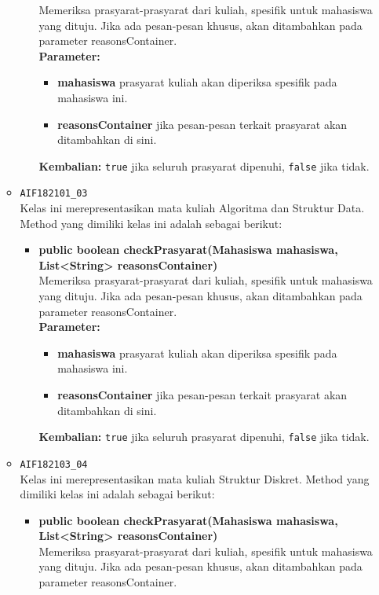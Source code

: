 \begin{enumerate}
\begin{itemize}
\begin{itemize}
			Memeriksa prasyarat-prasyarat dari kuliah, spesifik untuk mahasiswa yang dituju. Jika ada pesan-pesan khusus, akan ditambahkan pada parameter reasonsContainer.\\
			\textbf{Parameter:}
			\begin{itemize}
				\item \textbf{mahasiswa} prasyarat kuliah akan diperiksa spesifik pada mahasiswa ini.
				\item \textbf{reasonsContainer} jika pesan-pesan terkait prasyarat akan ditambahkan di sini.
			\end{itemize}
			\textbf{Kembalian:} \texttt{true} jika seluruh prasyarat dipenuhi, \texttt{false} jika tidak.
		\end{itemize}
		\item \texttt{AIF182101\_03} \\
		Kelas ini merepresentasikan mata kuliah Algoritma dan Struktur Data. Method yang dimiliki kelas ini adalah sebagai berikut: 
		\begin{itemize}
			\item \textbf{public boolean checkPrasyarat(Mahasiswa mahasiswa, List<String> reasonsContainer)}\\
			Memeriksa prasyarat-prasyarat dari kuliah, spesifik untuk mahasiswa yang dituju. Jika ada pesan-pesan khusus, akan ditambahkan pada parameter reasonsContainer.\\
			\textbf{Parameter:}
			\begin{itemize}
				\item \textbf{mahasiswa} prasyarat kuliah akan diperiksa spesifik pada mahasiswa ini.
				\item \textbf{reasonsContainer} jika pesan-pesan terkait prasyarat akan ditambahkan di sini.
			\end{itemize}
			\textbf{Kembalian:} \texttt{true} jika seluruh prasyarat dipenuhi, \texttt{false} jika tidak.
		\end{itemize}
		\item \texttt{AIF182103\_04} \\
		Kelas ini merepresentasikan mata kuliah Struktur Diskret. Method yang dimiliki kelas ini adalah sebagai berikut: 
		\begin{itemize}
			\item \textbf{public boolean checkPrasyarat(Mahasiswa mahasiswa, List<String> reasonsContainer)}\\
			Memeriksa prasyarat-prasyarat dari kuliah, spesifik untuk mahasiswa yang dituju. Jika ada pesan-pesan khusus, akan ditambahkan pada parameter reasonsContainer.\\

\end{itemize}
\end{itemize}
\end{enumerate}
